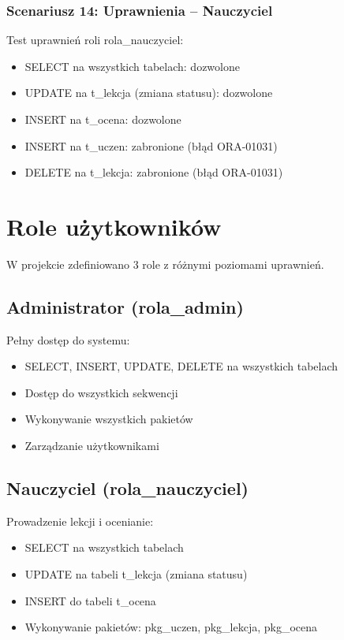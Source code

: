 \documentclass[12pt,a4paper]{article}
\begin{document}
\subsubsection{Scenariusz 14: Uprawnienia -- Nauczyciel}
Test uprawnień roli rola\_nauczyciel:
\begin{itemize}[nosep]
    \item SELECT na wszystkich tabelach: dozwolone
    \item UPDATE na t\_lekcja (zmiana statusu): dozwolone
    \item INSERT na t\_ocena: dozwolone
    \item INSERT na t\_uczen: zabronione (błąd ORA-01031)
    \item DELETE na t\_lekcja: zabronione (błąd ORA-01031)
\end{itemize}

\newpage
\section{Role użytkowników}

W projekcie zdefiniowano 3 role z różnymi poziomami uprawnień.

\subsection{Administrator (rola\_admin)}

Pełny dostęp do systemu:
\begin{itemize}[nosep]
    \item SELECT, INSERT, UPDATE, DELETE na wszystkich tabelach
    \item Dostęp do wszystkich sekwencji
    \item Wykonywanie wszystkich pakietów
    \item Zarządzanie użytkownikami
\end{itemize}

\subsection{Nauczyciel (rola\_nauczyciel)}

Prowadzenie lekcji i ocenianie:
\begin{itemize}[nosep]
    \item SELECT na wszystkich tabelach
    \item UPDATE na tabeli t\_lekcja (zmiana statusu)
    \item INSERT do tabeli t\_ocena
    \item Wykonywanie pakietów: pkg\_uczen, pkg\_lekcja, pkg\_ocena
\end{itemize}
\end{document}
